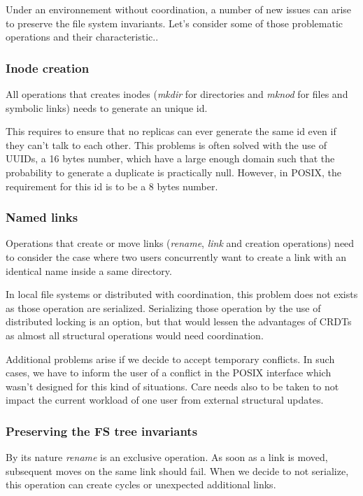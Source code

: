 \documentclass[sigplan, 10pt]{acmart}
\begin{document}
Under an environnement without coordination, a number of new issues can arise
to preserve the file system invariants. Let's consider some of those
problematic operations and their characteristic..

\subsubsection{Inode creation}

All operations that creates inodes
(\textit{mkdir} for directories and \textit{mknod} for files and symbolic links)
needs to generate an unique id.

This requires to ensure that no replicas can ever generate the same id even
if they can't talk to each other. This problems is often solved with the use
of UUIDs, a 16 bytes number, which have a large enough domain such
that the probability to generate a duplicate is practically null.
However, in POSIX, the requirement for this id is to be a 8 bytes number.

\subsubsection{Named links}

Operations that create or move links (\textit{rename}, \textit{link}
and creation operations) need to consider the case where two users
concurrently want to create a link with an identical name
inside a same directory.

In local file systems or distributed with coordination,
this problem does not exists as those operation are serialized. Serializing
those operation by the use of distributed locking is an option, but that would
lessen the advantages of CRDTs as almost all structural operations would need
coordination.

Additional problems arise if we decide to accept temporary conflicts. In such
cases, we have to inform the user of a conflict in the POSIX interface
which wasn't designed for this kind of situations. Care needs also to be taken
to not impact the current workload of one user from external structural
updates.

\subsubsection{Preserving the FS tree invariants}

By its nature \textit{rename} is an exclusive operation.
As soon as a link is moved, subsequent moves on the same link should fail.
When we decide to not serialize, this operation can create cycles
or unexpected additional links.
\end{document}
